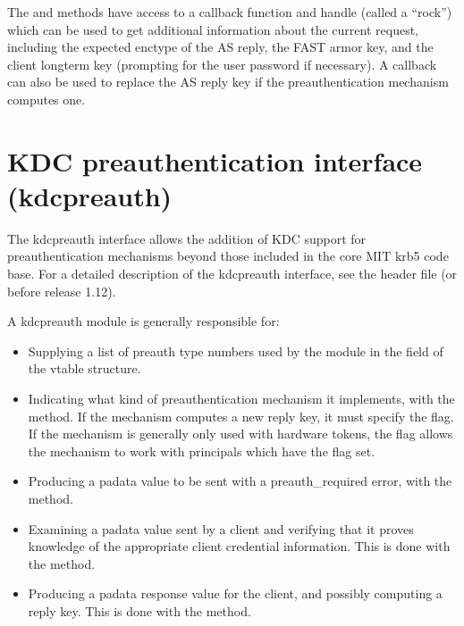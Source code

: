 \documentclass[letterpaper,10pt,english]{sphinxmanual}
\begin{document}
\sphinxAtStartPar
The  and  methods have access to a callback
function and handle (called a “rock”) which can be used to get
additional information about the current request, including the
expected enctype of the AS reply, the FAST armor key, and the client
long\sphinxhyphen{}term key (prompting for the user password if necessary).  A
callback can also be used to replace the AS reply key if the
preauthentication mechanism computes one.


\section{KDC preauthentication interface (kdcpreauth)}
\label{\detokenize{plugindev/kdcpreauth:kdc-preauthentication-interface-kdcpreauth}}\label{\detokenize{plugindev/kdcpreauth::doc}}
\sphinxAtStartPar
The kdcpreauth interface allows the addition of KDC support for
preauthentication mechanisms beyond those included in the core MIT
krb5 code base.  For a detailed description of the kdcpreauth
interface, see the header file  (or
 before release 1.12).

\sphinxAtStartPar
A kdcpreauth module is generally responsible for:
\begin{itemize}
\item {} 
\sphinxAtStartPar
Supplying a list of preauth type numbers used by the module in the
 field of the vtable structure.

\item {} 
\sphinxAtStartPar
Indicating what kind of preauthentication mechanism it implements,
with the  method.  If the mechanism computes a new reply
key, it must specify the  flag.  If the mechanism
is generally only used with hardware tokens, the 
flag allows the mechanism to work with principals which have the
 flag set.

\item {} 
\sphinxAtStartPar
Producing a padata value to be sent with a preauth\_required error,
with the  method.

\item {} 
\sphinxAtStartPar
Examining a padata value sent by a client and verifying that it
proves knowledge of the appropriate client credential information.
This is done with the  method.

\item {} 
\sphinxAtStartPar
Producing a padata response value for the client, and possibly
computing a reply key.  This is done with the 
method.

\end{itemize}
\end{document}
